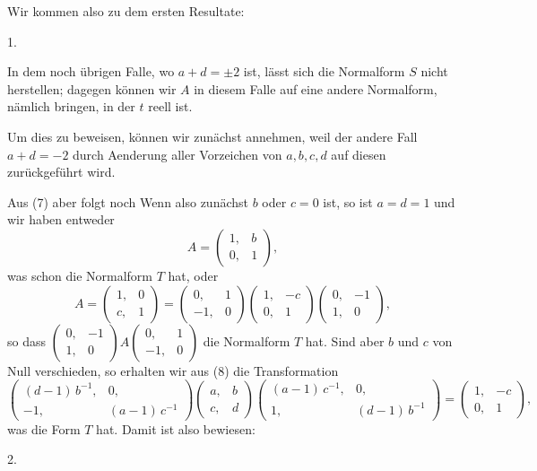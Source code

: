 Wir kommen also zu dem ersten Resultate:

1.~

In dem noch übrigen Falle, wo $a+d = \pm 2$ ist, lässt sich
die Normalform $S$ nicht herstellen; dagegen können wir $A$ in
diesem Falle auf eine andere Normalform, nämlich
bringen, in der $t$ reell ist.

Um dies zu beweisen, können wir zunächst
annehmen, weil der andere Fall $a+d = -2$ durch Aenderung
aller Vorzeichen von $a, b, c, d$ auf diesen zurückgeführt wird.

Aus (7) aber folgt noch
Wenn also zunächst $b$ oder $c = 0$ ist, so ist $a = d = 1$
und wir haben entweder
\[
A = \begin{pmatrix} 1, & b \\ 0, & 1 \end{pmatrix},
\]
was schon die Normalform $T$ hat, oder
\[
A = \begin{pmatrix} 1, & 0 \\ c, & 1 \end{pmatrix} = \begin{pmatrix} 0, & 1 \\ -1, & 0 \end{pmatrix} \begin{pmatrix} 1, & -c \\ 0, & 1 \end{pmatrix} \begin{pmatrix} 0, & -1 \\ 1, & 0 \end{pmatrix},
\]
so dass $\begin{pmatrix} 0, & -1 \\ 1, & 0 \end{pmatrix} A \begin{pmatrix} 0, & 1 \\ -1, & 0 \end{pmatrix}$ die Normalform $T$ hat. Sind aber $b$ und $c$ von Null verschieden,
so erhalten wir aus (8) die Transformation
\[
\begin{pmatrix} (d-1)\,b^{-1}, & 0, \\ -1, & (a-1)\,c^{-1} \end{pmatrix} \begin{pmatrix} a, & b \\ c, & d \end{pmatrix} \begin{pmatrix} (a-1)\,c^{-1}, & 0, \\ 1, & (d-1)\,b^{-1} \end{pmatrix} = \begin{pmatrix} 1, & -c \\ 0, & 1 \end{pmatrix},
\]
was die Form $T$ hat. Damit ist also bewiesen:

2.~
